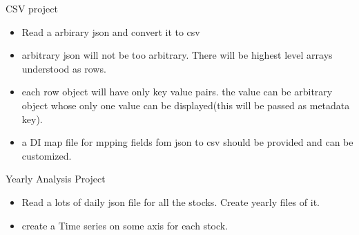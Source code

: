 \documentclass{beamer}
\begin{document}
\begin{frame}{CSV project}
	\begin{itemize}
		\item Read a arbirary json and convert it to csv
		\item arbitrary json will not be too arbitrary. There will be highest level arrays understood as rows.
		\item each row object will have only key value pairs. the value can be arbitrary object whose only one value can be displayed(this will be passed as metadata key).
		\item a DI map file for mpping fields fom json to csv should be provided and can be customized.
	\end{itemize}
\end{frame}

\begin{frame}{Yearly Analysis Project}
	\begin{itemize}
		\item Read a lots of  daily json file for all the stocks. Create yearly files of it.
		\item create a Time series  on some axis for each stock.
	\end{itemize}
\end{frame}
\end{document}
